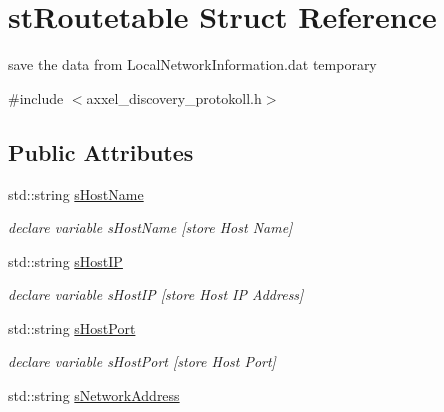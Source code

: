 \hypertarget{structstRoutetable}{\section{st\-Routetable Struct Reference}
\label{structstRoutetable}
}


save the data from Local\-Network\-Information.\-dat temporary  




{\ttfamily \#include $<$axxel\-\_\-discovery\-\_\-protokoll.\-h$>$}

\subsection*{Public Attributes}
\begin{DoxyCompactItemize}
\item 
\hypertarget{structstRoutetable_a7e4e8ff4c0d99dde9f168795056ae06c}{std\-::string \hyperlink{structstRoutetable_a7e4e8ff4c0d99dde9f168795056ae06c}{s\-Host\-Name}}\label{structstRoutetable_a7e4e8ff4c0d99dde9f168795056ae06c}

\begin{DoxyCompactList}\small\item\em declare variable s\-Host\-Name \mbox{[}store Host Name\mbox{]} \end{DoxyCompactList}\item 
\hypertarget{structstRoutetable_a5cdcd38c1c8a9fd2bb7a34b5550a5f8c}{std\-::string \hyperlink{structstRoutetable_a5cdcd38c1c8a9fd2bb7a34b5550a5f8c}{s\-Host\-I\-P}}\label{structstRoutetable_a5cdcd38c1c8a9fd2bb7a34b5550a5f8c}

\begin{DoxyCompactList}\small\item\em declare variable s\-Host\-I\-P \mbox{[}store Host I\-P Address\mbox{]} \end{DoxyCompactList}\item 
\hypertarget{structstRoutetable_a48bafcc14c088a68e976dd9a260dd6dd}{std\-::string \hyperlink{structstRoutetable_a48bafcc14c088a68e976dd9a260dd6dd}{s\-Host\-Port}}\label{structstRoutetable_a48bafcc14c088a68e976dd9a260dd6dd}

\begin{DoxyCompactList}\small\item\em declare variable s\-Host\-Port \mbox{[}store Host Port\mbox{]} \end{DoxyCompactList}\item 
\hypertarget{structstRoutetable_af2c8c267f263fa0065ea71714550e846}{std\-::string \hyperlink{structstRoutetable_af2c8c267f263fa0065ea71714550e846}{s\-Network\-Address}}\label{structstRoutetable_af2c8c267f263fa0065ea71714550e846}


\end{DoxyCompactItemize}

